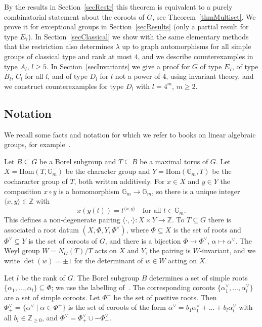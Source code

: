 \documentclass[11pt,a4paper]{article}
\theoremstyle{plain}
\theoremstyle{definition}
\newcommand{\Z}{\mathbb{Z}}
\newcommand{\Gm}{\mathbb{G}_m}
\begin{document}
By the results in Section~\ref{secRestr} this theorem is equivalent to a
purely combinatorial statement about the coroots of $G$, see 
Theorem~\ref{thmMultiset}. We prove it for exceptional groups in 
Section~\ref{secResults} (only a partial result for type $E_7$).
In Section~\ref{secClassical} we show with the same elementary methods
that the restriction also determines $\lambda$ up to graph automorphisms
for all simple groups of classical type and rank at most $4$, and we
describe counterexamples in type $A_l$, $l \geq 5$. In
Section~\ref{secInvariants} we give a proof for $G$ of type $E_7$, of type
$B_l$, $C_l$ for all $l$, and of type $D_l$ for $l$ not a power of $4$, using
invariant theory, and we construct counterexamples for type $D_l$ with
$l = 4^m$, $m \geq 2$.

\subsection{Notation}\label{secNotation}

We recall some facts and notation for which we refer to books on linear
algebraic groups, for example~\cite{spr,hum,milne,maltes}.

Let $B \subseteq G$ be a Borel subgroup and $T \subseteq B$ be a maximal
torus of $G$. Let $X = \textrm{Hom}(T, \Gm)$ be the character group and
$Y = \textrm{Hom}(\Gm, T)$ be the cocharacter group of $T$, both written
additively. For $x \in X$ and $y \in Y$ the composition $x \circ y$ is a
homomorphism $\Gm \to \Gm$, so there is a unique integer 
$\langle x, y \rangle \in \Z$ with
\[ x(y(t)) = t^{\langle x,y \rangle} \quad \textrm{for all } t \in \Gm. \]
This defines a non-degenerate pairing $\langle \cdot, \cdot \rangle
: X \times Y \to \Z$. To $T \subseteq G$ there is associated a root datum
$(X,\Phi,Y,\Phi^\vee)$, where $\Phi \subseteq X$ is the set of roots and
$\Phi^\vee \subseteq Y$ is the set of coroots of $G$, and there is a
bijection $\Phi \to \Phi^\vee$, $\alpha \mapsto \alpha^\vee$. 
The Weyl group $W = N_G(T)/T$ acts on $X$ and $Y$, the pairing is
$W$-invariant, and we write $\det(w) = \pm 1$ for the determinant of 
$w \in W$ acting on $X$.

Let $l$ be the rank of $G$. The Borel subgroup $B$ determines a set of
simple roots $\{\alpha_1, \ldots, \alpha_l\} \subseteq \Phi$; we
use the labelling of~\cite[Planches]{bou}. The corresponding coroots
$\{\alpha_1^\vee, \ldots, \alpha_l^\vee\}$ are a set of simple coroots.
Let $\Phi^+$ be the set of positive roots. Then 
$\Phi^\vee_+ = \{\alpha^\vee \mid \alpha \in \Phi^+\}$ is the set of 
coroots of the form $\alpha^\vee = b_1 \alpha_1^\vee + \ldots + b_l
\alpha_l^\vee$ with all $b_i \in \Z_{\geq 0}$, and $\Phi^\vee = \Phi^\vee_+
\cup -\Phi^\vee_+$.
\end{document}
